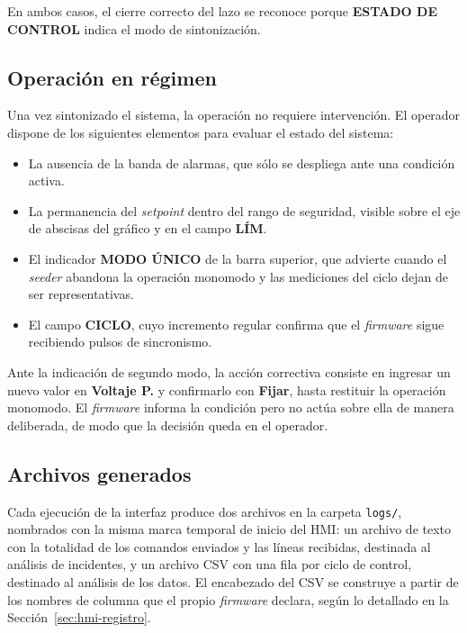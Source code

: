En ambos casos, el cierre correcto del lazo se reconoce porque \textbf{ESTADO DE
CONTROL} indica el modo de sintonización.

\subsection{Operación en régimen}

Una vez sintonizado el sistema, la operación no requiere intervención. El operador dispone de los siguientes elementos para evaluar el estado del sistema:

\begin{itemize}
  \item La ausencia de la banda de alarmas, que sólo se despliega ante una
        condición activa.
  \item La permanencia del \emph{setpoint} dentro del rango de seguridad, visible
        sobre el eje de abscisas del gráfico y en el campo \textbf{LÍM}.
  \item El indicador \textbf{MODO ÚNICO} de la barra superior, que advierte cuando el
        \emph{seeder} abandona la operación monomodo y las mediciones del ciclo dejan
        de ser representativas.
  \item El campo \textbf{CICLO}, cuyo incremento regular confirma que el
        \emph{firmware} sigue recibiendo pulsos de sincronismo.
\end{itemize}

Ante la indicación de segundo modo, la acción correctiva consiste en ingresar un
nuevo valor en \textbf{Voltaje P.} y confirmarlo con \textbf{Fijar}, hasta restituir
la operación monomodo. El \emph{firmware} informa la condición pero no actúa sobre
ella de manera deliberada, de modo que la decisión queda en el operador.

\subsection{Archivos generados}

Cada ejecución de la interfaz produce dos archivos en la carpeta \texttt{logs/}, nombrados con la misma marca temporal de inicio del HMI: un archivo de texto con la totalidad de los comandos enviados y las líneas recibidas, destinada al análisis de incidentes, y un archivo CSV con una fila por ciclo de control, destinado al análisis de los datos. El encabezado del CSV se construye a partir de los nombres de columna que el propio \emph{firmware} declara, según lo detallado en la Sección~\ref{sec:hmi-registro}.

